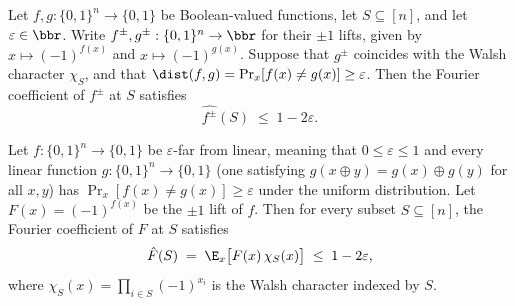 \begin{lemma}
\label{BoolBLR.fourier_coeff_le_of_dist_ge}
\leanok
{}
Let $f,g:\{0,1\}^n\to\{0,1\}$ be Boolean-valued functions, let $S\subseteq[n]$, and let
$\varepsilon\in\bbr$. Write $f^{\pm},g^{\pm}:\{0,1\}^n\to\bbr$ for their $\pm1$ lifts,
given by $x\mapsto(-1)^{f(x)}$ and $x\mapsto(-1)^{g(x)}$. Suppose that $g^{\pm}$
coincides with the Walsh character $\chi_S$, and that $\dist(f,g)=\Pr_{x}[f(x)\ne
g(x)]\ge\varepsilon$. Then the Fourier coefficient of $f^{\pm}$ at $S$ satisfies
\[\widehat{f^{\pm}}(S)\;\le\;1-2\varepsilon.\]
\end{lemma}

\begin{lemma}
\label{BoolBLR.fourier_coeff_le_of_far_from_linear}
\leanok
{}
Let $f : \{0,1\}^n \to \{0,1\}$ be $\varepsilon$-far from linear, meaning that $0 \le
\varepsilon \le 1$ and every linear function $g : \{0,1\}^n \to \{0,1\}$ (one satisfying
$g(x \oplus y) = g(x) \oplus g(y)$ for all $x,y$) has $\Pr_{x}[f(x) \ne g(x)] \ge
\varepsilon$ under the uniform distribution. Let $F(x) = (-1)^{f(x)}$ be the $\pm 1$
lift of $f$. Then for every subset $S \subseteq [n]$, the Fourier coefficient of $F$ at
$S$ satisfies
\[
  \hat F(S) \;=\; \E_{x}\bigl[F(x)\,\chi_S(x)\bigr] \;\le\; 1 - 2\varepsilon,
\]
where $\chi_S(x) = \prod_{i \in S}(-1)^{x_i}$ is the Walsh character indexed by $S$.
\end{lemma}

